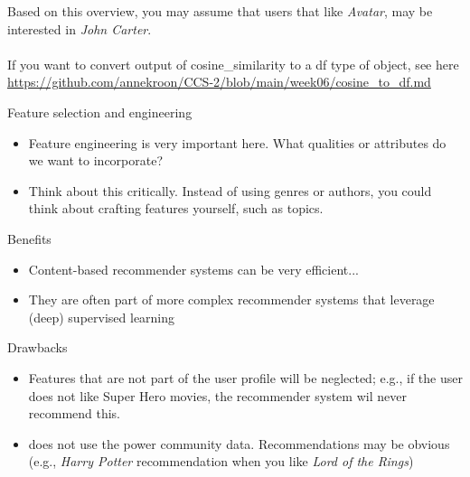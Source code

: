 \documentclass[compress]{beamer}
\begin{document}
\begin{frame}[plain]
\pause
Based on this overview, you may assume that users that like \textit{Avatar}, may be interested in \textit{John Carter}. 
\pause
\\
\\
\footnotesize{If you want to convert output of \alert{cosine\_similarity} to a \alert{df} type of object, see here \url{https://github.com/annekroon/CCS-2/blob/main/week06/cosine_to_df.md} }
\end{frame}

\begin{frame}
\begin{block}{Feature selection and engineering}
\begin{itemize}
	\item Feature engineering is very important here. What qualities or attributes do we want to incorporate?
	\pause
	\item Think about this critically. Instead of using genres or authors, you could think about crafting features yourself, such as topics. 
	\pause
\end{itemize}
\end{block}
\end{frame}


\begin{frame}
\begin{exampleblock}{Benefits}
\begin{itemize}
	\item <1-> Content-based recommender systems can be very efficient...
	\item <2->They are often part of more complex recommender systems that leverage (deep) supervised learning
\end{itemize}
\end{exampleblock}
\begin{alertblock}{Drawbacks}
	\begin{itemize}
		\item <3->Features that are not part of the user profile will be neglected; e.g., if the user does not like Super Hero movies, the recommender system wil never recommend this. 
		\item <4->does not use the power community data. Recommendations may be obvious (e.g., \textit{Harry Potter} recommendation when you like \textit{Lord of the Rings})
	\end{itemize}
\end{alertblock}
\end{frame}
\end{document}
